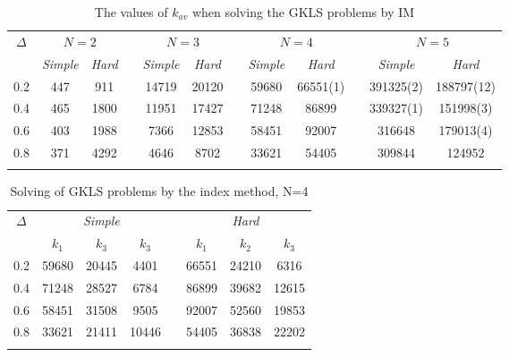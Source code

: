 \documentclass{llncs}
\begin{document}
\begin{table}
	\caption{The values of $k_{av}$ when solving the GKLS problems by IM}
	\label{tab:IM_GKLS}
	\center
	\begin{tabular}{cccccccccccc}
		\hline\noalign{\smallskip}
		$\Delta$ & \multicolumn{2}{c}{ $N=2$ } & & \multicolumn{2}{c}{$N=3$} & & \multicolumn{2}{c}{$N=4$} & & \multicolumn{2}{c}{$N=5$}  \\
		\noalign{\smallskip} \cline{2-3} \cline{5-6} \cline{8-9} \cline{11-12} \noalign{\smallskip}
		 & \textit{Simple} & \textit{Hard} & & \textit{Simple} & \textit{Hard} & & \textit{Simple} & \textit{Hard} & & \textit{Simple} & \textit{Hard}  \\
		\noalign{\smallskip} \hline \noalign{\smallskip}
		0.2 &	447 &	911 & &	14719 &	20120 & &	59680 &	66551(1) & &	391325(2) &	188797(12) \\ 			
		0.4 & 465 &	1800 & & 11951 &	17427 & &	71248 &	86899 & &	339327(1) &	151998(3) \\
		0.6 & 403 &	1988 & &	7366 &	12853 & &	58451 &	92007 & &	316648 &	179013(4) \\
		0.8 & 371	& 4292 & &	4646 &	8702 & &	33621 &	54405 & &	309844 &	124952\\
		\noalign{\smallskip}\hline
	\end{tabular}
\end{table}

\begin{table}
	\caption{Solving of GKLS problems by the index method, N=4}
	\label{tab:IM_GKLS_k}
	\center
	\begin{tabular}{cccccccc}
		\hline\noalign{\smallskip}
		$\Delta$ & \multicolumn{3}{c}{ \textit{Simple} } & & \multicolumn{3}{c}{\textit{Hard}} \\
		\noalign{\smallskip} \cline{2-4} \cline{6-8} \noalign{\smallskip}
		 & $k_1$ & $k_3$ & $k_3$& & $k_1$ & $k_2$ & $k_3$ \\
		\noalign{\smallskip} \hline \noalign{\smallskip}
		0.2 &	59680 &	20445 &	4401 & &	66551 &	24210 &	6316 \\ 			
		0.4 & 71248	& 28527	& 6784 & &	86899 &	39682 &	12615 \\
		0.6 & 58451 &	31508 &	9505 & &	92007 &	52560 &	19853 \\
		0.8 & 33621	& 21411	& 10446 & &	54405 &	36838 &	22202 \\
		
		\noalign{\smallskip}\hline
	\end{tabular}
\end{table}
\end{document}
